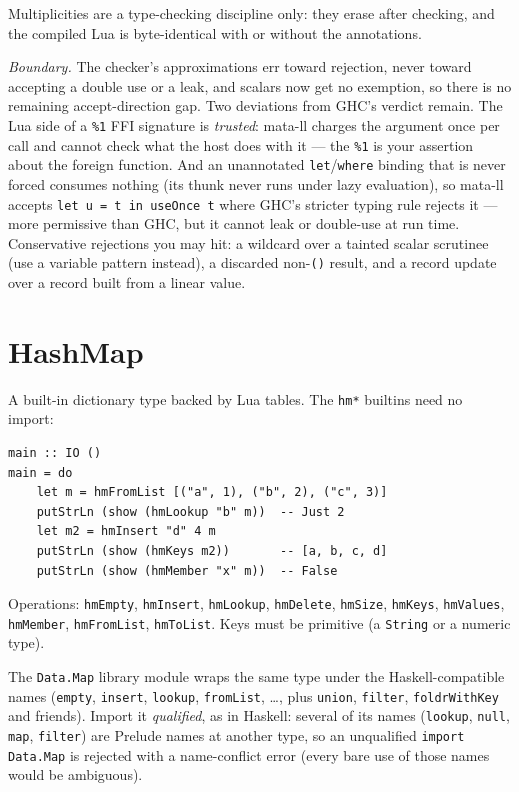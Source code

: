 \documentclass[11pt,a4paper]{article}
\begin{document}
Multiplicities are a type-checking discipline only: they erase after
checking, and the compiled Lua is byte-identical with or without the
annotations.

\emph{Boundary.} The checker's approximations err toward rejection,
never toward accepting a double use or a leak, and scalars now get no
exemption, so there is no remaining accept-direction gap. Two
deviations from GHC's verdict remain. The Lua side of a \texttt{\%1}
FFI signature is \emph{trusted}: mata-ll charges the argument once per
call and cannot check what the host does with it --- the \texttt{\%1}
is your assertion about the foreign function. And an unannotated
\texttt{let}/\texttt{where} binding that is never forced consumes
nothing (its thunk never runs under lazy evaluation), so mata-ll
accepts \texttt{let u = t in useOnce t} where GHC's stricter typing
rule rejects it --- more permissive than GHC, but it cannot leak or
double-use at run time. Conservative rejections you may hit: a wildcard
over a tainted scalar scrutinee (use a variable pattern instead), a
discarded non-\texttt{()} result, and a record update over a record
built from a linear value.

\section{HashMap}

A built-in dictionary type backed by Lua tables.  The \texttt{hm*}
builtins need no import:

\begin{lstlisting}
main :: IO ()
main = do
    let m = hmFromList [("a", 1), ("b", 2), ("c", 3)]
    putStrLn (show (hmLookup "b" m))  -- Just 2
    let m2 = hmInsert "d" 4 m
    putStrLn (show (hmKeys m2))       -- [a, b, c, d]
    putStrLn (show (hmMember "x" m))  -- False
\end{lstlisting}

Operations: \texttt{hmEmpty}, \texttt{hmInsert}, \texttt{hmLookup},
\texttt{hmDelete}, \texttt{hmSize}, \texttt{hmKeys}, \texttt{hmValues},
\texttt{hmMember}, \texttt{hmFromList}, \texttt{hmToList}.  Keys must
be primitive (a \texttt{String} or a numeric type).

The \texttt{Data.Map} library module wraps the same type under the
Haskell-compatible names (\texttt{empty}, \texttt{insert},
\texttt{lookup}, \texttt{fromList}, \ldots, plus \texttt{union},
\texttt{filter}, \texttt{foldrWithKey} and friends).  Import it
\emph{qualified}, as in Haskell: several of its names
(\texttt{lookup}, \texttt{null}, \texttt{map}, \texttt{filter})
are Prelude names at another type, so an unqualified
\texttt{import Data.Map} is rejected with a name-conflict error
(every bare use of those names would be ambiguous).
\end{document}
